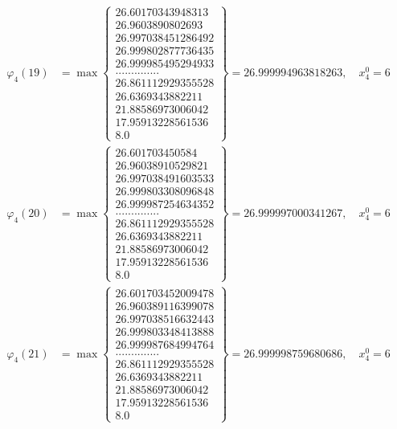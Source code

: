 \documentclass{article}
\begin{document}
\begin{align*}
  
  
  
\varphi_{4}(19) &= \max \left\{ \begin{array}{c}
26.60170343948313 \\
 26.9603890802693 \\
 26.997038451286492 \\
 26.999802877736435 \\
 26.999985495294933 \\
 .............. \\
 26.861112929355528 \\
 26.6369343882211 \\
 21.88586973006042 \\
 17.95913228561536 \\
 8.0
\end{array} \right\} = 26.999994963818263, \quad x_{4}^0 = 6\\
  
  
  
  
\varphi_{4}(20) &= \max \left\{ \begin{array}{c}
26.601703450584 \\
 26.96038910529821 \\
 26.997038491603533 \\
 26.999803308096848 \\
 26.999987254634352 \\
 .............. \\
 26.861112929355528 \\
 26.6369343882211 \\
 21.88586973006042 \\
 17.95913228561536 \\
 8.0
\end{array} \right\} = 26.999997000341267, \quad x_{4}^0 = 6\\
  
  
  
  
\varphi_{4}(21) &= \max \left\{ \begin{array}{c}
26.601703452009478 \\
 26.960389116399078 \\
 26.997038516632443 \\
 26.999803348413888 \\
 26.999987684994764 \\
 .............. \\
 26.861112929355528 \\
 26.6369343882211 \\
 21.88586973006042 \\
 17.95913228561536 \\
 8.0
\end{array} \right\} = 26.999998759680686, \quad x_{4}^0 = 6\\
  

\end{align*}
\end{document}
